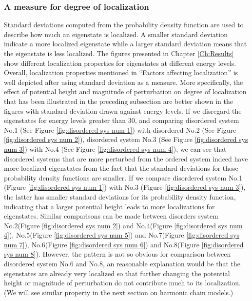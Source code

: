 \subsubsection{A measure for degree of localization
}
Standard deviations computed from the probability density function are used to describe how much an eigenstate is localized. A smaller standard deviation indicate a more localized eigenstate while a larger standard deviation means that the eigenstate is less localized. The figures presented in Chapter \ref{Ch:Results} show different localization properties for eigenstates at different energy levels. 
Overall, localization properties mentioned in “Factors affecting localization” is well depicted after using standard deviation as a measure. More specifically, the effect of potential height and magnitude of perturbation on degree of localization that has been illustrated in the preceding subsection are better shown in the figures with standard deviation drawn against energy levels. 
If we disregard the eigenstates for energy levels greater than 30, and comparing disordered system No.1 (See Figure \ref{fig:disordered sys num 1}) with disordered No.2 (See Figure \ref{fig:disordered sys num 2}), disordered system No.3 (See Figure \ref{fig:disordered sys num 3}) with No.4 (See Figure \ref{fig:disordered sys num 4}), we can see that disordered systems that are more perturbed from the ordered system indeed have more localized eigenstates from the fact that the standard deviations for those probability density functions are smaller.  
If we compare disordered system No.1 (Figure \ref{fig:disordered sys num 1}) with No.3 (Figure \ref{fig:disordered sys num 3}), the latter has smaller standard deviations for its probability density function, indicating that a larger potential height leads to more localizations for eigenstates. Similar comparisons can be made between disorders system No.2(Figure \ref{fig:disordered sys num 2}) and No.4(Figure \ref{fig:disordered sys num 4}), No.5(Figure \ref{fig:disordered sys num 5}) and No.7(Figure \ref{fig:disordered sys num 7}), No.6(Figure \ref{fig:disordered sys num 6}) and No.8(Figure \ref{fig:disordered sys num 8}). However, the pattern is not so obvious for comparison between disordered system No.6 and No.8, an reasonable explanation would be that the eigenstates are already very localized so that further changing the potential height or magnitude of perturbation do not contribute much to its localization. (We will see similar property in the next section on harmonic chain models.)
